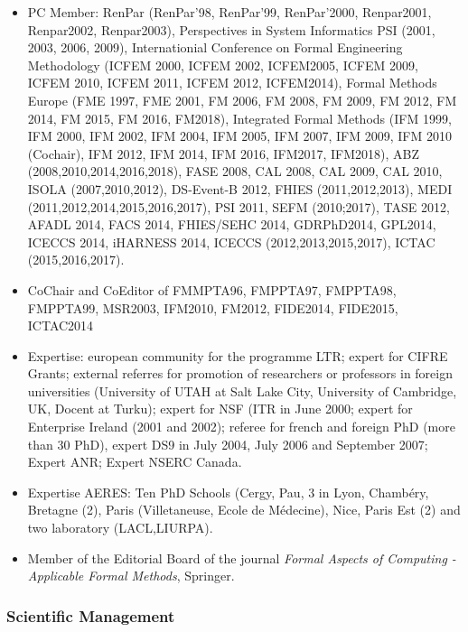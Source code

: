 \documentclass[ 12pt]{article}
\begin{document}
\begin{itemize}
\item PC Member:  RenPar (RenPar'98,
  RenPar'99, RenPar'2000,   Renpar2001,     Renpar2002,   Renpar2003),
  Perspectives  in System  Informatics  PSI (2001,  2003, 2006, 2009),
  Internationial Conference  on  Formal Engineering Methodology (ICFEM
  2000,  ICFEM  2002, ICFEM2005,  ICFEM  2009, ICFEM 2010, ICFEM 2011,
  ICFEM 2012,  ICFEM2014), Formal Methods Europe  (FME 1997, FME 2001,
  FM 2006, FM 2008,  FM  2009, FM 2012, FM   2014, FM 2015,  FM 2016, FM2018),
  Integrated Formal Methods (IFM 1999, IFM 2000, IFM 2002, IFM 2004, IFM
  2005,  IFM 2007, IFM  2009, IFM 2010 (Cochair),  IFM 2012, IFM 2014,
  IFM 2016, IFM2017, IFM2018),  ABZ (2008,2010,2014,2016,2018), FASE 2008, CAL 2008,
  CAL 2009, CAL  2010, ISOLA (2007,2010,2012),  DS-Event-B 2012, FHIES
  (2011,2012,2013),  MEDI   (2011,2012,2014,2015,2016,2017), PSI 2011,
  SEFM (2010;2017), TASE 2012, AFADL 2014, FACS 2014, FHIES/SEHC 2014,
  GDRPhD2014,   GPL2014,   ICECCS   2014,    iHARNESS   2014,   ICECCS
  (2012,2013,2015,2017), ICTAC (2015,2016,2017).

\item CoChair and CoEditor of FMMPTA96, FMPPTA97, FMPPTA98, FMPPTA99, MSR2003, 
IFM2010, FM2012, FIDE2014, FIDE2015, ICTAC2014
\item Expertise: european community for  the programme LTR; expert for
  CIFRE   Grants; external referres  for  promotion  of researchers or
  professors in foreign universities  (University of UTAH at Salt Lake
  City, University of Cambridge, UK, Docent at  Turku); expert for NSF
  (ITR in June  2000; expert for Enterprise  Ireland (2001 and  2002);
  referee for french and foreign PhD (more than 30 PhD), expert DS9 in
  July  2004, July 2006 and  September  2007; Expert ANR; Expert NSERC
  Canada.


\item Expertise  AERES: Ten PhD Schools (Cergy, Pau,  3 in  Lyon, Chamb\'ery, Bretagne (2), Paris (Villetaneuse,   Ecole de M\'edecine), Nice, Paris Est (2) and two laboratory (LACL,LIURPA). 



\item Member of the Editorial Board of the journal \textit{Formal Aspects of Computing - 
Applicable Formal Methods}, Springer.

\end{itemize}



\subsubsection{Scientific Management}
\end{document}
